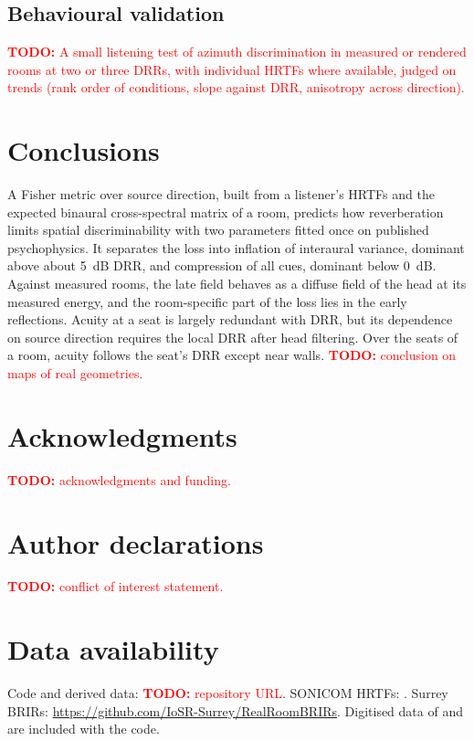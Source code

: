 \documentclass[11pt]{article}
\newcommand{\todo}[1]{\textcolor{red}{\textbf{TODO:} #1}}
\begin{document}
\subsection{Behavioural validation}
\todo{A small listening test of azimuth discrimination in measured or rendered rooms at two or three DRRs, with individual HRTFs where available, judged on trends (rank order of conditions, slope against DRR, anisotropy across direction).}

\section{Conclusions}
A Fisher metric over source direction, built from a listener's HRTFs and the expected binaural cross-spectral matrix of a room, predicts how reverberation limits spatial discriminability with two parameters fitted once on published psychophysics. It separates the loss into inflation of interaural variance, dominant above about 5~dB DRR, and compression of all cues, dominant below 0~dB. Against measured rooms, the late field behaves as a diffuse field of the head at its measured energy, and the room-specific part of the loss lies in the early reflections. Acuity at a seat is largely redundant with DRR, but its dependence on source direction requires the local DRR after head filtering. Over the seats of a room, acuity follows the seat's DRR except near walls. \todo{conclusion on maps of real geometries.}

\section*{Acknowledgments}
\todo{acknowledgments and funding.}

\section*{Author declarations}
\todo{conflict of interest statement.}

\section*{Data availability}
Code and derived data: \todo{repository URL}. SONICOM HRTFs: \citet{engel2023}. Surrey BRIRs: \url{https://github.com/IoSR-Surrey/RealRoomBRIRs}. Digitised data of \citet{rakerd2010} and \citet{litovsky2001} are included with the code.
\end{document}

